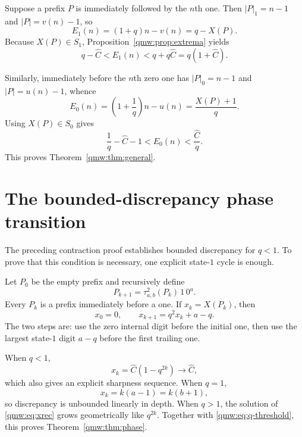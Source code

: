 \documentclass[11pt]{article}
\numberwithin{equation}{section}
\theoremstyle{definition}
\theoremstyle{remark}
\newcommand{\abs}[1]{\lvert#1\rvert}
\newcommand{\ones}[1]{\lvert#1\rvert_1}
\newcommand{\zeros}[1]{\lvert#1\rvert_0}
\begin{document}
Suppose a prefix $P$ is immediately followed by the $n$th one.  Then
$\ones P=n-1$ and $\abs P=v(n)-1$, so
\begin{equation}\label{qmw:eq:E1X}
E_1(n)=(1+q)n-v(n)=q-X(P).
\end{equation}
Because $X(P)\in S_1$, Proposition~\ref{qmw:prop:extrema} yields
\[
q-{\widehat C}<E_1(n)<q+q{\widehat C}=q(1+{\widehat C}).
\]

Similarly, immediately before the $n$th zero one has
$\zeros P=n-1$ and $\abs P=u(n)-1$, whence
\begin{equation}\label{qmw:eq:E0X}
E_0(n)=\left(1+\frac1q\right)n-u(n)=\frac{X(P)+1}{q}.
\end{equation}
Using $X(P)\in S_0$ gives
\[
\frac1q-{\widehat C}-1<E_0(n)<\frac{\widehat C}q.
\]
This proves Theorem~\ref{qmw:thm:general}.

\section{The bounded-discrepancy phase transition}\label{qmw:sec:phase}

The preceding contraction proof establishes bounded discrepancy for $q<1$.
To prove that this condition is necessary, one explicit state-$1$ cycle is
enough.

Let $P_0$ be the empty prefix and recursively define
\begin{equation}\label{qmw:eq:Pk}
P_{k+1}=\tau_{a,b}^2(P_k)\,1\,0^a.
\end{equation}
Every $P_k$ is a prefix immediately before a one.  If $x_k=X(P_k)$, then
\begin{equation}\label{qmw:eq:xrec}
x_0=0,
\qquad
x_{k+1}=q^2x_k+a-q.
\end{equation}
The two steps are: use the zero internal digit before the initial one, then
use the largest state-$1$ digit $a-q$ before the first trailing one.

When $q<1$,
\begin{equation}\label{qmw:eq:xclosed}
x_k={\widehat C}(1-q^{2k})\longrightarrow {\widehat C},
\end{equation}
which also gives an explicit sharpness sequence.  When $q=1$,
\[
x_k=k(a-1)=k(b+1),
\]
so discrepancy is unbounded linearly in depth.  When $q>1$, the solution of
\eqref{qmw:eq:xrec} grows geometrically like $q^{2k}$.  Together with
\eqref{qmw:eq:q-threshold}, this proves Theorem~\ref{qmw:thm:phase}.
\end{document}
